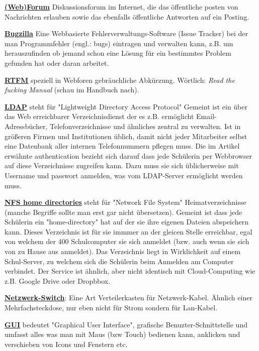 \href{http://de.wikipedia.org/wiki/Webforum}{\textbf{(Web)Forum}} Diskussionsforum im Internet, die das öffentliche posten von Nachrichten erlauben sowie das ebenfalls öffentliche Antworten auf ein Posting. 

\href{http://de.wikipedia.org/wiki/Bugzilla}{\textbf{Bugzilla}} Eine Webbasierte Fehlerverwaltungs-Software (Issue Tracker) bei der man Programmfehler (engl.: bugs) eintragen und verwalten kann, z.B. um herauszufinden ob jemand schon eine Lösung für ein bestimmtes Problem gefunden hat oder daran arbeitet. 

\href{https://en.wikipedia.org/wiki/Rtfm}{\textbf{RTFM}} speziell in Webforen gebräuchliche Abkürzung. Wörtlich: \textit{Read the fucking Manual} (schau im Handbuch nach). 

\href{http://en.wikipedia.org/wiki/Ldap}{\textbf{LDAP}} steht für "Lightweight Directory Access Protocol" Gemeint ist ein über das Web erreichbarer Verzeichnisdienst der es z.B. ermöglicht Email-Adressbücher, Telefonverzeichnisse und ähnliches zentral zu verwalten. Ist in größeren Firmen und Institutionen üblich, damit nicht jeder Mitarbeiter selbst eine Datenbank aller internen Telefonnummern pflegen muss. Die im Artikel erwähnte authentication bezieht sich darauf dass jede Schülerin per Webbrowser auf diese Verzeichnisse zugreifen kann. Dazu muss sie sich üblicherweise mit Username und passwort anmelden, was vom LDAP-Server ermöglicht werden muss. 

\href{http://de.wikipedia.org/wiki/Network_File_System}{\textbf{NFS home directories}} steht für "Network File System" Heimatverzeichnisse (manche Begriffe sollte man erst gar nicht übersetzen). Gemeint ist dass jede Schülerin ein "home-directory" hat auf der sie ihre eigenen Dateien abspeichern kann. Dieses Verzeichnis ist für sie immmer an der gleicen Stelle erreichbar, egal von welchem der 400 Schulcomputer sie sich anmeldet (bzw. auch wenn sie sich von zu Hause aus anmeldet). Das Verzeichnis liegt in Wirklichkeit auf einem Schul-Server, zu welchem sich die Schülerin beim Anmelden am Computer verbindet. Der Service ist ähnlich, aber nicht identisch mit Cloud-Computing wie z.B. Google Drive oder Dropbbox. 

\href{http://de.wikipedia.org/wiki/Switch_(Netzwerktechnik)}{\textbf{Netzwerk-Switch}}: Eine Art Verteilerkasten für Netzwerk-Kabel. Ähnlich einer Mehrfachsteckdose, nur eben nicht für Strom sondern für Lan-Kabel. 

\href{http://en.wikipedia.org/wiki/Graphical_user_interface}{\textbf{GUI}} bedeutet "Graphical User Interface", grafische Benuzter-Schnittstelle und umfasst alles was man mit Maus (bzw Touch) bedienen kann, anklicken und verschieben von Icons und Fenstern etc.

